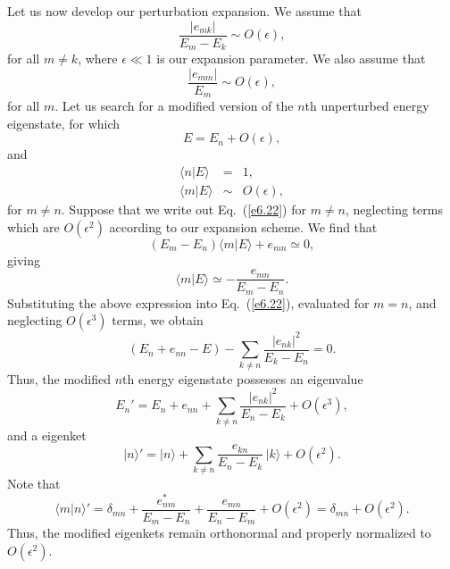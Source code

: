 Let us now develop our perturbation expansion. We assume that
\begin{equation}
\frac{|e_{mk}|}{E_m - E_k} \sim O(\epsilon),
\end{equation}
for all $m\neq k$, where $\epsilon\ll 1$ is our expansion parameter. We also
assume that
\begin{equation}
\frac{|e_{mm}|}{E_m} \sim O(\epsilon),
\end{equation} 
for all $m$. Let us search for a modified version of the $n$th unperturbed energy
eigenstate, for which
\begin{equation}
E= E_n + O(\epsilon),
\end{equation}
and
\begin{eqnarray}
\langle n|E\rangle &=& 1,\\[0.5ex]
\langle m|E\rangle &\sim& O(\epsilon),
\end{eqnarray}
for $m\neq n$. Suppose that we 
write out Eq.~(\ref{e6.22}) for $m\neq n$, neglecting terms which
are $O(\epsilon^2)$ according to our expansion scheme. We find that
\begin{equation}
(E_m - E_n) \langle m |E \rangle + e_{mn} \simeq 0,
\end{equation} 
giving 
\begin{equation}
\langle m|E\rangle \simeq -\frac{e_{mn}}{E_m - E_n}.
\end{equation}
Substituting the above expression into Eq.~(\ref{e6.22}),
evaluated  for $m=n$, and neglecting $O(\epsilon^3)$ terms, we obtain
\begin{equation}
(E_n + e_{nn} - E)  - \sum_{k\neq n} \frac{|e_{nk}|^2}
{E_k-E_n} = 0.
\end{equation}
Thus, the modified $n$th energy eigenstate possesses an  eigenvalue
\begin{equation}\label{e6.32}
E_n' = E_n + e_{nn} +  \sum_{k\neq n} \frac{|e_{nk}|^2}
{E_n-E_k} + O(\epsilon^3),
\end{equation}
and a eigenket
\begin{equation}\label{e6.33}
|n\rangle' = |n\rangle   +\sum_{k\neq n}\frac{e_{kn}}{E_n - E_k}\,|k\rangle + O(\epsilon^2).
\end{equation}
Note that
\begin{equation}
\langle m|n\rangle' = \delta_{mn} + \frac{e_{nm}^\ast}{E_m-E_n} + \frac{e_{mn}}
{E_n-E_m} + O(\epsilon^2) = \delta_{mn} + O(\epsilon^2).
\end{equation}
Thus, the modified eigenkets remain  orthonormal and properly normalized
to $O(\epsilon^2)$. 

